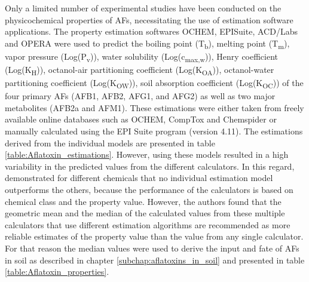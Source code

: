 Only a limited number of experimental studies have been conducted on the physicochemical properties of AFs, necessitating the use of estimation software applications. The property estimation softwares OCHEM, EPISuite, ACD/Labs and OPERA were used to predict the boiling point (T\textsubscript{b}), melting point (T\textsubscript{m}), vapor pressure  (Log(P\textsubscript{v})), water solubility (Log(c\textsubscript{max,w})), Henry coefficient (Log(K\textsubscript{H})), octanol-air partitioning coefficient (Log(K\textsubscript{OA})), octanol-water partitioning coefficient (Log(K\textsubscript{OW})),   soil absorption coefficient (Log(K\textsubscript{OC})) of the four primary AFs (AFB1, AFB2, AFG1, and AFG2) as well as two major metabolites (AFB2a and AFM1). These estimations were either taken from freely available online databases such as OCHEM, CompTox and Chemspider or manually calculated using the EPI Suite program (version 4.11). The estimations derived from the individual models are presented in table \ref{table:Aflatoxin_estimations}. However, using these models resulted in a high variability in the predicted values from the different calculators. In this regard, \citet{tebes2018demonstration} demonstrated for different chemicals that no individual estimation model outperforms the others, because the performance of the calculators is based on chemical class and the property value. However, the authors found that the geometric mean  and the median of the calculated values from these multiple calculators that use different estimation algorithms are recommended as more reliable estimates of the property value than the value from any single calculator. For that reason the median values were used to derive the input and fate of AFs in soil as described in chapter \ref{subchap:aflatoxins_in_soil} and presented in table \ref{table:Aflatoxin_properties}.

 

\clearpage
